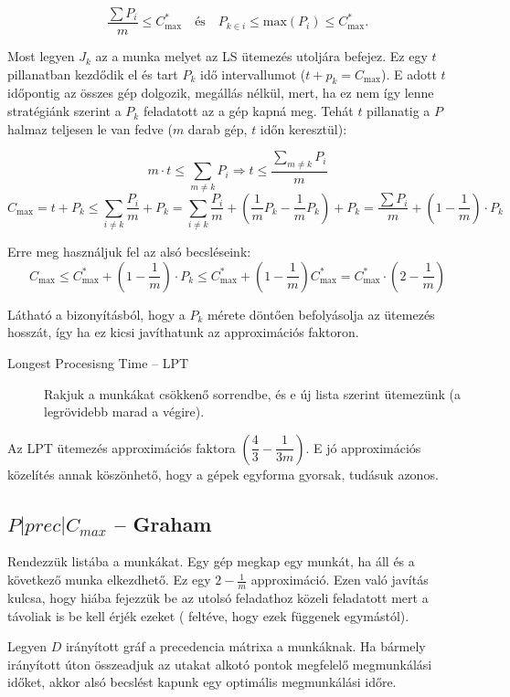 \[ \frac{\sum P_i}{m} \leq C^*_{\mbox{max}} ~~~\mbox{ és }~~~
   P_{k \in i} \leq \mbox{max} (P_i) \leq C^*_{\mbox{max}}. 
\]

Most legyen $J_k$ az a munka melyet az LS ütemezés utoljára befejez. Ez egy $t$
pillanatban kezdődik el és tart $P_k$ idő intervallumot ($t+p_k=C_{\mbox{max}}$).
E adott $t$ időpontig az összes gép dolgozik, megállás nélkül, mert, ha ez nem
így lenne stratégiánk szerint a $P_k$ feladatott az a gép kapná meg. Tehát $t$
pillanatig a $P$ halmaz teljesen le van fedve ($m$ darab gép, $t$ időn
keresztül):

\[ m \cdot t \leq \sum_{m \neq k}P_i \Rightarrow t \leq \frac{\sum\limits_{m \neq k}P_i}{m} 
\]
\[ C_{\mbox{max}}=t+P_k \leq \sum_{i \neq  k} \frac{P_i}{m} + P_k = \sum_{i \neq
 k} \frac{P_i}{m} + \left(\frac{1}{m} P_k - \frac{1}{m} P_k\right) + P_k 
 = \frac{\sum P_i}{m} + \left(1-\frac{1}{m}\right) \cdot P_k
\]

Erre meg használjuk fel az alsó becsléseink:
\[
C_{\mbox{max}} \leq C^*_{\mbox{max}} + \left(1-\frac{1}{m}\right) \cdot P_k 
\leq C^*_{\mbox{max}} + \left(1-\frac{1}{m}\right) C^*_{\mbox{max}} 
=C^*_{\mbox{max}} \cdot \left(2-\frac{1}{m}\right)
\]

Látható a bizonyításból, hogy a $P_k$ mérete döntően befolyásolja az ütemezés
hosszát, így ha ez kicsi javíthatunk az approximációs faktoron. 
\begin{description}
  \item[Longest Procesisng Time -- LPT ] Rakjuk a munkákat csökkenő
  sorrendbe, és e új lista szerint ütemezünk (a legrövidebb marad a végire).
\end{description}
 
Az LPT ütemezés approximációs faktora $\left( \dfrac{4}{3} - \dfrac{1}{3m}
\right)$. E jó approximációs közelítés annak köszönhető, hogy a gépek egyforma
gyorsak, tudásuk azonos.

\subsection{ \texorpdfstring {$ P|prec|C_{max} $} {P|prec|Cmax} -- Graham}

Rendezzük listába a munkákat. Egy gép megkap egy munkát, ha áll és a következő
munka elkezdhető. Ez egy $2-\frac{1}{m}$ approximáció. Ezen való javítás kulcsa,
hogy hiába fejezzük be az utolsó feladathoz közeli feladatott mert a távoliak is
be kell érjék ezeket ( feltéve, hogy ezek függenek egymástól). 

Legyen $D$ irányított gráf a precedencia mátrixa a munkáknak. Ha bármely
irányított úton összeadjuk az utakat alkotó pontok megfelelő megmunkálási
időket, akkor alsó becslést kapunk egy optimális megmunkálási időre.

